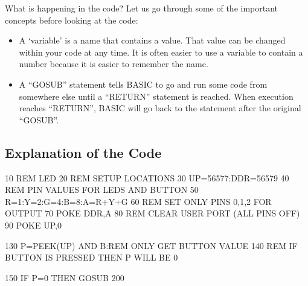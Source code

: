 What is happening in the code?  Let us go through some of the important concepts before looking at the code:
\begin{itemize}
\item A `variable' is a name that contains a value.  That value can be changed within your code at any time.  It is often easier to use a variable to contain a number because it is easier to remember the name.
\item A ``GOSUB'' statement tells BASIC to go and run some code from somewhere else until a ``RETURN'' statement is reached.  When execution reaches ``RETURN'', BASIC will go back to the statement after the original ``GOSUB''.
\end{itemize}

\subsection*{Explanation of the Code}

\begin{basic}
10 REM LED
20 REM SETUP LOCATIONS
30 UP=56577:DDR=56579
40 REM PIN VALUES FOR LEDS AND BUTTON
50 R=1:Y=2:G=4:B=8:A=R+Y+G
60 REM SET ONLY PINS 0,1,2 FOR OUTPUT
70 POKE DDR,A
80 REM CLEAR USER PORT (ALL PINS OFF)
90 POKE UP,0
\end{basic}


\begin{basic}
130 P=PEEK(UP) AND B:REM ONLY GET BUTTON VALUE
140 REM IF BUTTON IS PRESSED THEN P WILL BE 0
\end{basic}


\begin{basic}
150 IF P=0 THEN GOSUB 200
\end{basic}


